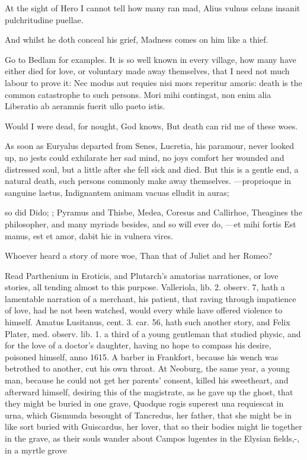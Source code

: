 At the sight of Hero I cannot tell how many ran mad,
Alius vulnus celans insanit pulchritudine puellae.

And whilst he doth conceal his grief,
Madness comes on him like a thief.

Go to Bedlam for examples. It is so well known in every village, how
many have either died for love, or voluntary made away themselves, that
I need not much labour to prove it: Nec modus aut requies nisi
mors reperitur amoris: death is the common catastrophe to such persons.
Mori mihi contingat, non enim alia
Liberatio ab aeramnis fuerit ullo paeto istis.

Would I were dead, for nought, God knows,
But death can rid me of these woes.

As soon as Euryalus departed from Senes, Lucretia, his paramour, never
looked up, no jests could exhilarate her sad mind, no joys comfort her
wounded and distressed soul, but a little after she fell sick and died.
But this is a gentle end, a natural death, such persons commonly make
away themselves.
---proprioque in sanguine laetus,
Indignantem animam vacuas elludit in auras;

so did Dido; ; 
Pyramus and Thisbe, Medea, Coresus and Callirhoe, Theagines
the philosopher, and many myriads besides, and so will ever do,
---et mihi fortis
Est manus, est et amor, dabit hic in vulnera vires.

Whoever heard a story of more woe,
Than that of Juliet and her Romeo?

Read Parthenium in Eroticis, and Plutarch's amatorias narrationes, or
love stories, all tending almost to this purpose. Valleriola, lib. 2.
observ. 7, hath a lamentable narration of a merchant, his patient,
 that raving through impatience of love, had he not been watched,
would every while have offered violence to himself. Amatus Lusitanus,
cent. 3. car. 56, hath such another story, and Felix Plater, med.
observ. lib. 1. a third of a young gentleman that studied physic,
and for the love of a doctor's daughter, having no hope to compass his
desire, poisoned himself, anno 1615. A barber in Frankfort,
because his wench was betrothed to another, cut his own throat.
At Neoburg, the same year, a young man, because he could not get
her parents' consent, killed his sweetheart, and afterward himself,
desiring this of the magistrate, as he gave up the ghost, that they
might be buried in one grave, Quodque rogis superest una requiescat in
urna, which  Gismunda besought of Tancredus, her father, that she
might be in like sort buried with Guiscardus, her lover, that so their
bodies might lie together in the grave, as their souls wander about
Campos lugentes in the Elysian fields,-, in a myrtle grove

